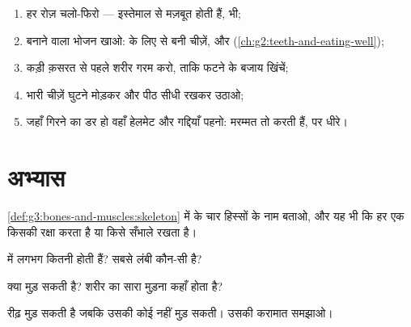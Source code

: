\begin{method}[हड्डियों और पेशियों की देखभाल]\label{met:g3:bones-and-muscles:care}
\begin{enumerate}
  \item हर रोज़ चलो-फिरो --- इस्तेमाल से  मज़बूत होती हैं,
         भी;
  \item बनाने वाला भोजन खाओ:  के लिए  से बनी चीज़ें, और
         (\cref{ch:g2:teeth-and-eating-well});
  \item कड़ी क़सरत से पहले शरीर गरम करो, ताकि  फटने के बजाय
        खिंचें;
  \item भारी चीज़ें घुटने मोड़कर और पीठ सीधी रखकर उठाओ;
  \item जहाँ गिरने का डर हो वहाँ हेलमेट और गद्दियाँ पहनो: 
        मरम्मत तो करती हैं, पर धीरे।
\end{enumerate}
\end{method}

\section{अभ्यास}

\begin{exercise}[$\star$]\label{exo:g3:bones-and-muscles:1}
\cref{def:g3:bones-and-muscles:skeleton} में  के चार हिस्सों के
नाम बताओ, और यह भी कि हर एक किसकी रक्षा करता है या किसे सँभाले रखता
है।
\end{exercise}

\begin{exercise}[$\star$]\label{exo:g3:bones-and-muscles:2}
 में लगभग कितनी  होती हैं? सबसे लंबी कौन-सी है?
\end{exercise}

\begin{exercise}[$\star$]\label{exo:g3:bones-and-muscles:3}
क्या  मुड़ सकती है? शरीर का सारा मुड़ना कहाँ होता है?
\end{exercise}

\begin{exercise}[$\star$]\label{exo:g3:bones-and-muscles:4}
रीढ़ मुड़ सकती है जबकि उसकी कोई  नहीं मुड़ सकती। उसकी करामात
समझाओ।
\end{exercise}

